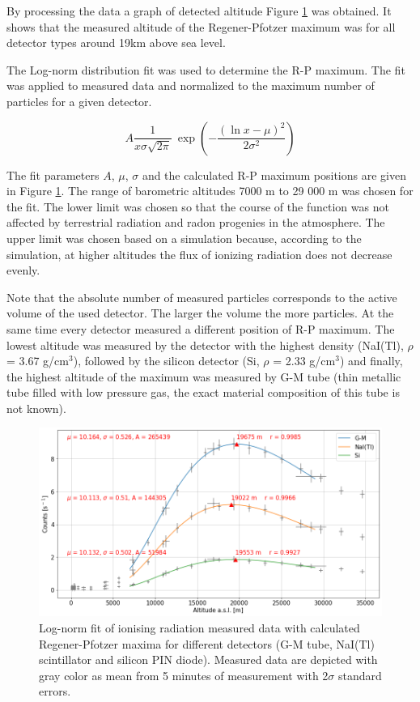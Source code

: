 \documentclass{Rpd}
\begin{document}
By processing the data a graph of detected altitude Figure \ref{R-P_maximum} was obtained. It shows that the measured altitude of the Regener-Pfotzer maximum was for all detector types around 19km above sea level.

The Log-norm distribution fit was used to determine the R-P maximum. The fit was applied to measured data and normalized to the maximum number of particles for a given detector.

\begin{equation}A \frac 1 {x\sigma\sqrt{2\pi}}\ \exp\left( - \frac{\left(\ln x-\mu\right)^2}{2\sigma^2}\right)\end{equation}

The fit parameters $A$, $\mu$, $\sigma$ and the calculated R-P maximum positions are given in Figure \ref{R-P_maximum}. The range of barometric altitudes 7000 m to 29 000 m was chosen for the fit. The lower limit was chosen so that the course of the function was not affected by terrestrial radiation and radon progenies in the atmosphere. The upper limit was chosen based on a simulation because, according to the simulation, at higher altitudes the flux of ionizing radiation does not decrease evenly. 

Note that the absolute number of measured particles corresponds to the active volume of the used detector. The larger the volume the more particles. At the same time every detector measured a different position of R-P maximum. The lowest altitude was measured by the detector with the highest density (NaI(Tl), $\rho$ = 3.67 g/cm$^3$), followed by the silicon detector (Si, $\rho$ = 2.33 g/cm$^3$) and finally, the highest altitude of the maximum was measured by G-M tube (thin metallic tube filled with low pressure gas, the exact material composition of this tube is not known).

\begin{center}
\begin{figure}
	\centerline{\includegraphics[width=150mm]{img/FIK-6_R-P_maximum.png}}
	\caption{Log-norm fit of ionising radiation measured data with calculated Regener-Pfotzer maxima for different detectors (G-M tube, NaI(Tl) scintillator and silicon PIN diode). Measured data are depicted with gray color as mean from 5 minutes of measurement with 2$\sigma$ standard errors. \label{R-P_maximum}}
\end{figure}
\end{center}
\end{document}
